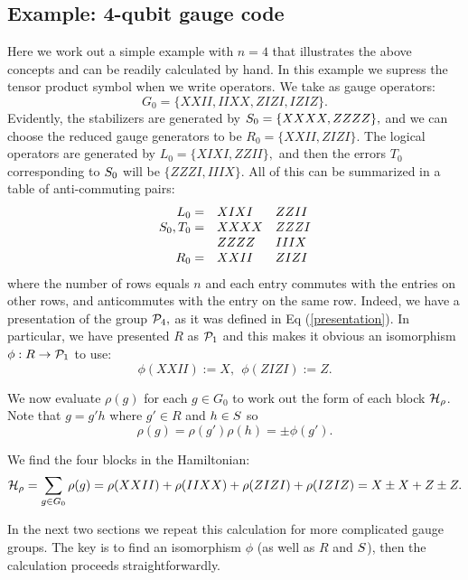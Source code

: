 \documentclass[12pt,notitlepage,longbibliography,nofootinbib,tightenlines]{revtex4}
\begin{document}
\subsection{Example: 4-qubit gauge code}

Here we work out a simple example with $n=4$
that illustrates the above concepts and can
be readily calculated by hand.
In this example we supress the tensor product
symbol when we write operators.
We take as gauge operators:
$$
    G_0 = \{XXII, IIXX, ZIZI, IZIZ\}.
$$
Evidently, the stabilizers are generated by $S_0=\{XXXX, ZZZZ\},$
and we can choose the reduced gauge generators to be $R_0=\{XXII, ZIZI\}.$
The logical operators are generated by $L_0 = \{XIXI, ZZII\},$
and then the errors $T_0$ corresponding to $S_0$ will
be $\{ZZZI, IIIX\}.$
All of this can be summarized in a table of anti-commuting pairs:
$$
\begin{array}{rll}
L_0 = &XIXI & ZZII \\
S_0, T_0 = &XXXX & ZZZI \\
           &ZZZZ & IIIX \\
R_0 = &XXII & ZIZI \\
\end{array}
$$
where the number of rows equals $n$ and each entry
commutes with the entries on other rows, and anticommutes
with the entry on the same row. Indeed, we have a presentation
of the group $\mathcal{P}_4,$ as it was defined in Eq (\ref{presentation}).
In particular, we have presented $R$ as $\mathcal{P}_1$ and this
makes it obvious an isomorphism $\phi:R\to \mathcal{P}_1$
to use: %
$$
    \phi(XXII) := X, \ \ \phi(ZIZI) := Z.
$$

We now evaluate $\rho(g)$ for each $g\in G_0$ 
to work out the form of each block $\mathcal{H}_\rho$.
Note that $g=g'h$ where $g'\in R$ and $h\in S$
so 
$$\rho(g)=\rho(g')\rho(h)=\pm\phi(g').$$

We find the four blocks in the Hamiltonian:
$$
\mathcal{H}_\rho = \sum_{g\in G_0} \rho(g) = \rho(XXII) + \rho(IIXX) + \rho(ZIZI) + \rho(IZIZ) = X \pm X + Z \pm Z.
$$

In the next two sections we repeat this calculation for
more complicated gauge groups.
The key is to find an isomorphism $\phi$ (as well as $R$ and $S$),
then the calculation proceeds straightforwardly.

%
%
\end{document}
